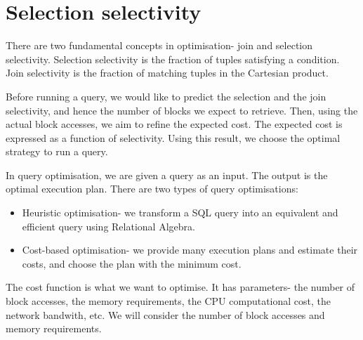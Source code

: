 \documentclass[a4paper, openany]{memoir}
\theoremstyle{definition}
\theoremstyle{plain}
\begin{document}

\newpage

\section{Selection selectivity}
There are two fundamental concepts in optimisation- join and selection selectivity. Selection selectivity is the fraction of tuples satisfying a condition. Join selectivity is the fraction of matching tuples in the Cartesian product.

Before running a query, we would like to predict the selection and the join selectivity, and hence the number of blocks we expect to retrieve. Then, using the actual block accesses, we aim to refine the expected cost. The expected cost is expressed as a function of selectivity. Using this result, we choose the optimal strategy to run a query.

In query optimisation, we are given a query as an input. The output is the optimal execution plan. There are two types of query optimisations:
\begin{itemize}
    \item Heuristic optimisation- we transform a SQL query into an equivalent and efficient query using Relational Algebra.
    \item Cost-based optimisation- we provide many execution plans and estimate their costs, and choose the plan with the minimum cost.
\end{itemize}
The cost function is what we want to optimise. It has parameters- the number of block accesses, the memory requirements, the CPU computational cost, the network bandwith, etc. We will consider the number of block accesses and memory requirements. 
\end{document}
